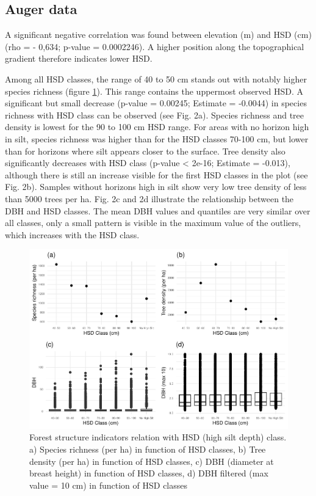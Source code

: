 \documentclass[fleqn,12pt]{latex/stylish_article} %
\begin{document}
\normalsize

\hypertarget{auger-data}{%
\subsection{Auger data}\label{auger-data}}

A significant negative correlation was found between elevation (m) and HSD (cm) (rho = - 0,634; p-value = 0.0002246). A higher position along the topographical gradient therefore indicates lower HSD.

Among all HSD classes, the range of 40 to 50 cm stands out with notably higher species richness (figure \ref{fig:auger}). This range contains the uppermost observed HSD. A significant but small decrease (p-value = 0.00245; Estimate = -0.0044) in species richness with HSD class can be observed (see Fig. 2a). Species richness and tree density is lowest for the 90 to 100 cm HSD range. For areas with no horizon high in silt, species richness was higher than for the HSD classes 70-100 cm, but lower than for horizons where silt appears closer to the surface. Tree density also significantly decreases with HSD class (p-value \textless{} 2e-16; Estimate = -0.013), although there is still an increase visible for the first HSD classes in the plot (see Fig. 2b). Samples without horizons high in silt show very low tree density of less than 5000 trees per ha.
Fig. 2c and 2d illustrate the relationship between the DBH and HSD classes. The mean DBH values and quantiles are very similar over all classes, only a small pattern is visible in the maximum value of the outliers, which increases with the HSD class.



\scriptsize

\begin{figure}

{\centering \includegraphics[width=0.8\linewidth,]{pedoP16-report_files/figure-latex/auger-1} 

}

\caption{Forest structure indicators relation with HSD (high silt depth) class. a) Species richness (per ha) in function of HSD classes, b) Tree density (per ha) in function of HSD classes, c) DBH (diameter at breast height) in function of HSD classes, d) DBH filtered (max value = 10 cm) in function of HSD classes}\label{fig:auger}
\end{figure}
\end{document}
